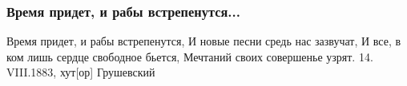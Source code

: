  
 
 

\subsubsection{Время придет, и рабы встрепенутся...}

Время придет, и рабы встрепенутся,
И новые песни средь нас зазвучат,
И все, в ком лишь сердце свободное бьется,
Мечтаний своих совершенье узрят.
14. VIII.1883, хут[ор] Грушевский 
